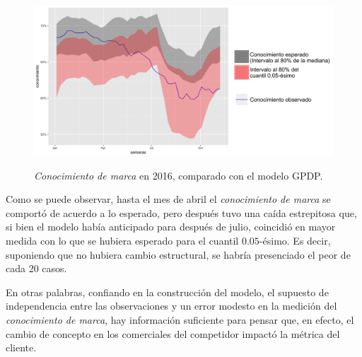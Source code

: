 \begin{figure}[H]
	\centering
	\caption{\textit{Conocimiento de marca} en 2016, comparado con el modelo GPDP.}
	\includegraphics[width=1\textwidth]{Figures/MarketResearch/goals_2016.png}
	\captionsetup{singlelinecheck=off,font=footnotesize}
	\label{awareness_fit}
\end{figure}

Como se puede observar, hasta el mes de abril el \textit{conocimiento de marca} se comport\'o de acuerdo a lo esperado, pero despu\'es tuvo una ca\'ida estrepitosa que, si bien el modelo hab\'ia anticipado para despu\'es de julio, coincidi\'o en mayor medida con lo que se hubiera esperado para el cuantil $0.05$-\'esimo. Es decir, suponiendo que no hubiera cambio estructural, se habr\'ia presenciado el peor de cada 20 casos.

En otras palabras, confiando en la construcci\'on del modelo, el supuesto de independencia entre las observaciones y un error modesto en la medici\'on del \textit{conocimiento de marca}, hay informaci\'on suficiente para pensar que, en efecto, el cambio de concepto en los comerciales del competidor impact\'o la m\'etrica del cliente.


\newpage